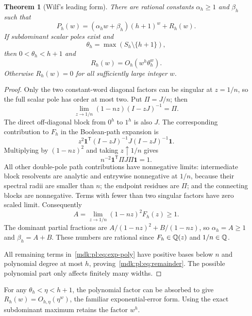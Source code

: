 \documentclass[11pt,letterpaper]{article}
\numberwithin{equation}{section}
\newtheorem{theorem}{Theorem}[section]
\theoremstyle{remark}\newtheorem{remark}[theorem]{Remark}
\newcommand{\one}{\mathbf 1}
\begin{document}
\begin{theorem}[Wilf's leading form]\label{mdk:pl:thm:leading}
There are rational constants $\alpha_h\ge1$ and $\beta_h$ such that
\begin{equation}\label{mdk:pl:eq:leading}
 P_h(w)=(\alpha_h w+\beta_h)(h+1)^w+R_h(w).
\end{equation}
If subdominant scalar poles exist and
\[
 \theta_h=\max(S_h\setminus\{h+1\}),
\]
then $0<\theta_h<h+1$ and
\begin{equation}\label{mdk:pl:eq:remainder}
 R_h(w)=O_h(w^h\theta_h^w).
\end{equation}
Otherwise $R_h(w)=0$ for all sufficiently large integer $w$.
\end{theorem}
\begin{proof}
Only the two constant-word diagonal factors can be singular at $z=1/n$, so the full scalar pole has order at most two. Put $\Pi=J/n$; then
\[
 \lim_{z\to1/n}(1-nz)(I-zJ)^{-1}=\Pi.
\]
The direct off-diagonal block from $0^h$ to $1^h$ is also $J$. The corresponding contribution to $F_h$ in the Boolean-path expansion is
\[
 z^2\one^{\mathsf T}(I-zJ)^{-1}J(I-zJ)^{-1}\one.
\]
Multiplying by $(1-nz)^2$ and taking $z\uparrow1/n$ gives
\begin{equation}\label{mdk:pl:eq:positivecontribution}
 n^{-2}\one^{\mathsf T}\Pi J\Pi\one=1.
\end{equation}
All other double-pole path contributions have nonnegative limits: intermediate block resolvents are analytic and entrywise nonnegative at $1/n$, because their spectral radii are smaller than $n$; the endpoint residues are $\Pi$; and the connecting blocks are nonnegative. Terms with fewer than two singular factors have zero scaled limit. Consequently
\[
 A=\lim_{z\to1/n}(1-nz)^2F_h(z)\ge1.
\]
The dominant partial fractions are $A/(1-nz)^2+B/(1-nz)$, so $\alpha_h=A\ge1$ and $\beta_h=A+B$. These numbers are rational since $F_h\in\mathbb Q(z)$ and $1/n\in\mathbb Q$.

All remaining terms in~\eqref{mdk:pl:eq:exp-poly} have positive bases below $n$ and polynomial degree at most $h$, proving~\eqref{mdk:pl:eq:remainder}. The possible polynomial part only affects finitely many widths.
\end{proof}

For any $\theta_h<\eta<h+1$, the polynomial factor can be absorbed to give $R_h(w)=O_{h,\eta}(\eta^w)$, the familiar exponential-error form. Using the exact subdominant maximum retains the factor $w^h$.
\end{document}
